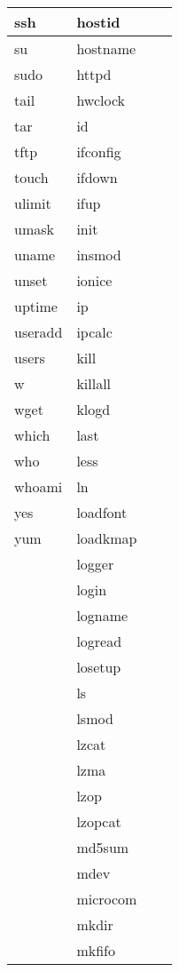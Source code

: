 \begin{longtable}{llp{120mm}p{120mm}}
     \hline
     ssh & hostid \\
     \hline
     su & hostname \\
     \hline
     sudo & httpd \\
     \hline
     tail & hwclock \\
     \hline
     tar & id \\
     \hline
     tftp & ifconfig \\
     \hline
     touch & ifdown \\
     \hline
     ulimit & ifup \\
     \hline
     umask & init \\
     \hline
     uname & insmod \\
     \hline
     unset & ionice \\
     \hline
     uptime & ip \\
     \hline
     useradd & ipcalc \\
     \hline
     users & kill \\
     \hline
     w & killall \\
     \hline
     wget & klogd \\
     \hline
     which & last \\
     \hline
     who & less \\
     \hline
     whoami & ln \\
     \hline
     yes & loadfont \\
     \hline
     yum & loadkmap \\
     \hline
      & logger \\
     \hline
      & login \\
     \hline
      & logname \\
     \hline
      & logread \\
     \hline
      & losetup \\
     \hline
      & ls \\
     \hline
      & lsmod \\
     \hline
      & lzcat \\
     \hline
      & lzma \\
     \hline
      & lzop \\
     \hline
      & lzopcat \\
     \hline
      & md5sum \\
     \hline
      & mdev \\
     \hline
      & microcom \\
     \hline
      & mkdir \\
     \hline
      & mkfifo \\

\end{longtable}
